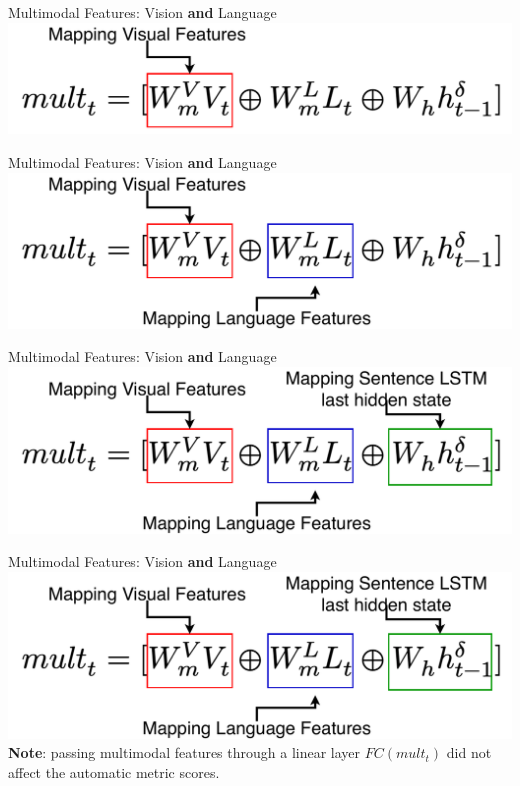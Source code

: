 \documentclass[notes=hide]{beamer}
\begin{document}
\begin{frame}{Multimodal Features: Vision \textbf{and} Language}
\small
\includegraphics[width=1\textwidth]{mapvis.pdf}
\end{frame}

\begin{frame}{Multimodal Features: Vision \textbf{and} Language}
\small
\includegraphics[width=1\textwidth]{maplan.pdf}
\end{frame}

\begin{frame}{Multimodal Features: Vision \textbf{and} Language}
\small
\includegraphics[width=1\textwidth]{maphid.pdf}
\end{frame}

\begin{frame}{Multimodal Features: Vision \textbf{and} Language}
\includegraphics[width=1\textwidth]{maphid.pdf}
\\ 
{\vspace{1cm}\textbf{Note}: passing multimodal features through a linear layer $FC(mult_t)$ did not affect the automatic metric scores.}
\end{frame}
\end{document}
